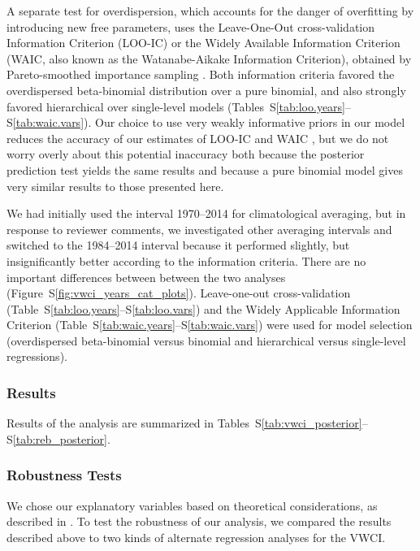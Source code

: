 \documentclass[draft]{agujournal}
\begin{document}
A separate test for overdispersion, which accounts for the danger of overfitting
by introducing new free parameters, uses the
Leave-One-Out cross-validation Information Criterion (LOO-IC)
or the
Widely Available Information Criterion (WAIC, also known as the
Watanabe-Aikake Information Criterion),
obtained by Pareto-smoothed importance sampling \citep{vehtari:loo:2016}.
Both information criteria favored the overdispersed beta-binomial distribution
over a pure binomial, and also strongly favored hierarchical over single-level
models (Tables~S\ref{tab:loo.years}--S\ref{tab:waic.vars}).
Our choice to use very weakly informative priors in our model reduces the
accuracy of our estimates of LOO-IC and WAIC \citep{vehtari:loo:2016},
but we do not worry overly about this potential inaccuracy both because the
posterior prediction test yields the same results and because a pure binomial
model gives very similar results to those presented here.

We had initially used the interval 1970--2014 for climatological averaging,
but in response to reviewer comments, we
investigated other averaging intervals and switched to the
1984--2014 interval because it performed slightly, but insignificantly better
according to the information criteria.
There are no important differences between between the two analyses
(Figure~S\ref{fig:vwci_years_cat_plots}).
\else
Leave-one-out cross-validation (Table~S\ref{tab:loo.years}--S\ref{tab:loo.vars})
and the Widely Applicable Information Criterion
(Table~S\ref{tab:waic.years}--S\ref{tab:waic.vars}) were used for model selection
(overdispersed beta-binomial versus binomial and hierarchical versus single-level
regressions).
\fi

\subsubsection*{Results}

Results of the analysis are summarized in
Tables~S\ref{tab:vwci_posterior}--S\ref{tab:reb_posterior}.

\subsubsection*{Robustness Tests}
We chose our explanatory variables based on theoretical considerations, as
described in \citet{hess:drought:2016}. To test the robustness of our analysis,
we compared the results described above to two kinds of alternate regression
analyses for the VWCI.
\end{document}
